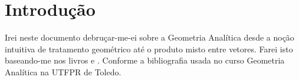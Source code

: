 \section{Introdução}

Irei neste documento debruçar-me-ei sobre a Geometria Analítica desde a noção
intuitiva de tratamento geométrico até o produto misto entre vetores. Farei isto
baseando-me nos livros 
\cite{winterle2014vetores} e 
\cite{steimbruch1987geometria}. Conforme a bibliografia usada no curso Geometria
Analítica na UTFPR de Toledo.
